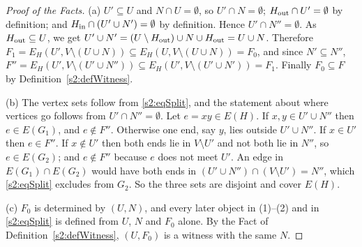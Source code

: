 \begin{proof}[Proof of the Facts]
(a) $U'\subseteq U$ and $N\cap U=\emptyset$, so $U'\cap N=\emptyset$;
$H_{\mathrm{out}}\cap U'=\emptyset$ by definition; and $H_{\mathrm{in}}\cap(U'\cup N')=\emptyset$ by
definition. Hence $U'\cap N''=\emptyset$. As $H_{\mathrm{out}}\subseteq U$, we get
$U'\cup N'=(U\setminus H_{\mathrm{out}})\cup N\cup H_{\mathrm{out}}=U\cup N$. Therefore
$F_1=E_H(U',V\setminus(U\cup N))\subseteq E_H(U,V\setminus(U\cup N))=F_0$, and
since $N'\subseteq N''$, $F''=E_H(U',V\setminus(U'\cup N''))\subseteq
E_H(U',V\setminus(U'\cup N'))=F_1$. Finally $F_0\subseteq F$ by
Definition~\ref{s2:defWitness}.

(b) The vertex sets follow from \eqref{s2:eqSplit}, and the statement about
where vertices go follows from $U'\cap N''=\emptyset$. Let $e=xy\in E(H)$. If
$x,y\in U'\cup N''$ then $e\in E(G_1)$, and $e\notin F''$. Otherwise one end,
say $y$, lies outside $U'\cup N''$. If $x\in U'$ then $e\in F''$. If
$x\notin U'$ then both ends lie in $V\setminus U'$ and not both lie in $N''$,
so $e\in E(G_2)$; and $e\notin F''$ because $e$ does not meet $U'$. An edge in
$E(G_1)\cap E(G_2)$ would have both ends in $(U'\cup N'')\cap(V\setminus
U')=N''$, which \eqref{s2:eqSplit} excludes from $G_2$. So the three sets are
disjoint and cover $E(H)$.

(c) $F_0$ is determined by $(U,N)$, and every later object in (1)--(2) and in
\eqref{s2:eqSplit} is defined from $U$, $N$ and $F_0$ alone. By the Fact of
Definition~\ref{s2:defWitness}, $(U,F_0)$ is a witness with the same $N$.
\end{proof}

